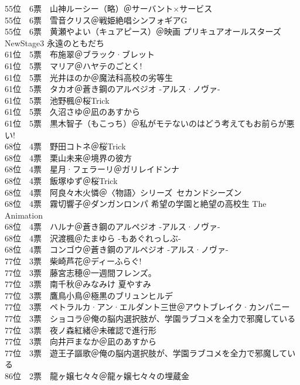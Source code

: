 { 55位　6票　山神ルーシー（略）＠サーバント×サービス\\
 55位　6票　雪音クリス＠戦姫絶唱シンフォギアG\\
 55位　6票　黄瀬やよい（キュアピース）＠映画 プリキュアオールスターズNewStage3 永遠のともだち\\
 61位　5票　布施翠＠ブラック·ブレット\\
 61位　5票　マリア＠ハヤテのごとく!\\
 61位　5票　光井ほのか＠魔法科高校の劣等生\\
 61位　5票　タカオ＠蒼き鋼のアルペジオ -アルス·ノヴァ-\\
 61位　5票　池野楓＠桜Trick\\
 61位　5票　久沼さゆ＠凪のあすから\\
 61位　5票　黒木智子（もこっち）＠私がモテないのはどう考えてもお前らが悪い!\\
 68位　4票　野田コトネ＠桜Trick\\
 68位　4票　栗山未来＠境界の彼方\\
 68位　4票　星月·フェラーリ＠ガリレイドンナ\\
 68位　4票　飯塚ゆず＠桜Trick\\
 68位　4票　阿良々木火憐＠〈物語〉シリーズ~セカンドシーズン\\
 68位　4票　霧切響子＠ダンガンロンパ 希望の学園と絶望の高校生 The Animation\\
 68位　4票　ハルナ＠蒼き鋼のアルペジオ -アルス·ノヴァ-\\
 68位　4票　沢渡楓＠たまゆら -もあぐれっしぶ-\\
 68位　4票　コンゴウ＠蒼き鋼のアルペジオ -アルス·ノヴァ-\\
 77位　3票　柴崎芦花＠ディーふらぐ!\\
 77位　3票　藤宮志穂＠一週間フレンズ。\\
 77位　3票　南千秋＠みなみけ 夏やすみ\\
 77位　3票　鷹鳥小鳥＠極黒のブリュンヒルデ\\
 77位　3票　ペトラルカ·アン·エルダント三世＠アウトブレイク·カンパニー\\
 77位　3票　ショコラ＠俺の脳内選択肢が、学園ラブコメを全力で邪魔している\\
 77位　3票　夜ノ森紅緒＠未確認で進行形\\
 77位　3票　向井戸まなか＠凪のあすから\\
 77位　3票　遊王子謳歌＠俺の脳内選択肢が、学園ラブコメを全力で邪魔している\\
 86位　2票　龍ヶ嬢七々々＠龍ヶ嬢七々々の埋蔵金\\
}
